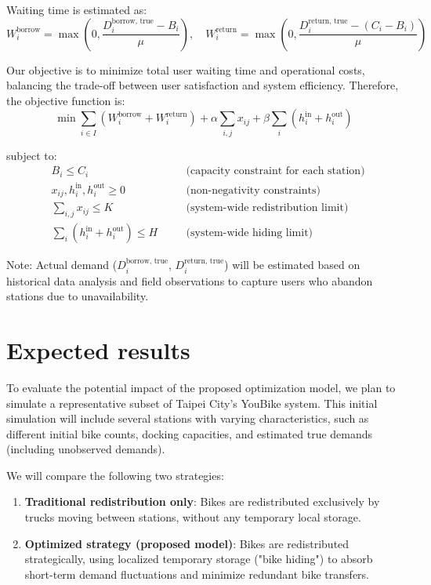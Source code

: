 \documentclass[11pt,a4paper]{article}
\begin{document}
Waiting time is estimated as:
\[
W_i^{\text{borrow}} = \max\left(0, \frac{D_i^{\text{borrow, true}} - B_i}{\mu}\right), \quad
W_i^{\text{return}} = \max\left(0, \frac{D_i^{\text{return, true}} - (C_i - B_i)}{\mu}\right)
\]

Our objective is to minimize total user waiting time and operational costs, balancing the trade-off between user satisfaction and system efficiency. Therefore, the objective function is:
\[
\min \sum_{i \in I} \left( W_i^{\text{borrow}} + W_i^{\text{return}} \right) + \alpha \sum_{i,j} x_{ij} + \beta \sum_{i} \left( h_i^{\text{in}} + h_i^{\text{out}} \right)
\]

subject to:
\begin{align*}
& B_i \leq C_i &\quad &\text{(capacity constraint for each station)} \\
& x_{ij}, h_i^{\text{in}}, h_i^{\text{out}} \geq 0 &\quad &\text{(non-negativity constraints)} \\
& \sum_{i,j} x_{ij} \leq K &\quad &\text{(system-wide redistribution limit)} \\
& \sum_{i}(h_i^{\text{in}} + h_i^{\text{out}}) \leq H &\quad &\text{(system-wide hiding limit)}
\end{align*}

Note: Actual demand ($D_i^{\text{borrow, true}}$, $D_i^{\text{return, true}}$) will be estimated based on historical data analysis and field observations to capture users who abandon stations due to unavailability.

\section{Expected results}

To evaluate the potential impact of the proposed optimization model, we plan to simulate a representative subset of Taipei City’s YouBike system. This initial simulation will include several stations with varying characteristics, such as different initial bike counts, docking capacities, and estimated true demands (including unobserved demands).

We will compare the following two strategies:

\begin{enumerate}
    \item \textbf{Traditional redistribution only}: Bikes are redistributed exclusively by trucks moving between stations, without any temporary local storage.
    \item \textbf{Optimized strategy (proposed model)}: Bikes are redistributed strategically, using localized temporary storage ("bike hiding") to absorb short-term demand fluctuations and minimize redundant bike transfers.
\end{enumerate}
\end{document}
